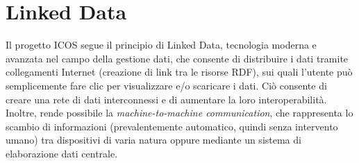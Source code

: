 \section{Linked Data}
\label{section:linkeddata}
Il progetto ICOS segue il principio di Linked Data, tecnologia moderna
e avanzata nel campo della gestione dati, che consente di distribuire
i dati tramite collegamenti Internet (creazione di link tra le risorse RDF), sui quali l'utente
può semplicemente fare clic per visualizzare e/o scaricare i dati.  Ciò consente di creare una rete di dati interconnessi
e di aumentare la loro interoperabilità. 
Inoltre, rende possibile la \textit{machine-to-machine communication}, 
che rappresenta lo scambio di informazioni (prevalentemente automatico,
quindi senza intervento umano) tra dispositivi di varia natura 
oppure mediante un sistema di elaborazione dati centrale.



